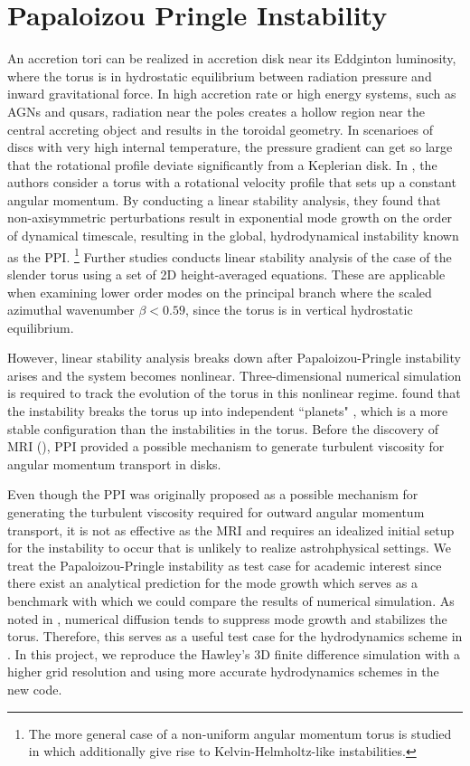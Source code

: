 \documentclass[iop,revtex4]{emulateapj}
\begin{document}
\section{Papaloizou Pringle Instability\label{ppi}}
An accretion tori can be realized in accretion disk near its Eddginton luminosity, where the torus is in hydrostatic equilibrium between radiation pressure and inward gravitational force. In high accretion rate or high energy systems, such as AGNs and qusars, radiation near the poles creates a hollow region near the central accreting object and results in the toroidal geometry. In scenarioes of discs with very high internal temperature, the pressure gradient can get so large that the rotational profile deviate significantly from a Keplerian disk.  In  \cite{Papaloizou:1984A}, the authors consider a torus with a rotational velocity profile that sets up a constant angular momentum. By conducting a linear stability analysis, they found that non-axisymmetric perturbations result in exponential mode growth on the order of dynamical timescale, resulting in the global, hydrodynamical instability known as the \acf{PPI}. \footnote{The more general case of a non-uniform angular momentum torus is studied in \cite{Papaloizou:1985A} which additionally give rise to Kelvin-Helmholtz-like instabilities.} Further studies conducts linear stability analysis of the case of the slender torus using a set of 2D height-averaged equations. These are applicable when examining lower order modes on the principal branch where the scaled azimuthal wavenumber $\beta<0.59$, since the torus is in vertical hydrostatic equilibrium. 
\par However, linear stability analysis breaks down after Papaloizou-Pringle instability arises and the system becomes nonlinear. Three-dimensional numerical simulation is required to track the evolution of the torus in this nonlinear regime. \cite{Hawley:1990A} found that the instability breaks the torus up into independent ``planets" , which is a more stable configuration than the instabilities in the torus. Before the discovery of \ac{MRI} (\cite{Balbus:1991A}), \ac{PPI} provided a possible mechanism to generate turbulent viscosity for angular momentum transport in disks. 
\par Even though the \ac{PPI} was originally proposed as a possible mechanism for generating the turbulent viscosity required for outward angular momentum transport, it is not as effective as the \ac{MRI} and requires an idealized initial setup for the instability to occur that is unlikely to realize astrohphysical settings. We treat the Papaloizou-Pringle instability as test case for academic interest since there exist an analytical prediction for the mode growth \cite{Goldreich:1986A} which serves as a benchmark with which we could compare the results of numerical simulation. As noted in \cite{Hawley:1991A}, numerical diffusion tends to suppress mode growth and stabilizes the torus. Therefore, this serves as a useful test case for the hydrodynamics scheme in \app. In this project, we reproduce the Hawley's 3D finite difference simulation with a higher grid resolution and using more accurate hydrodynamics schemes in the new \app code.
\end{document}
